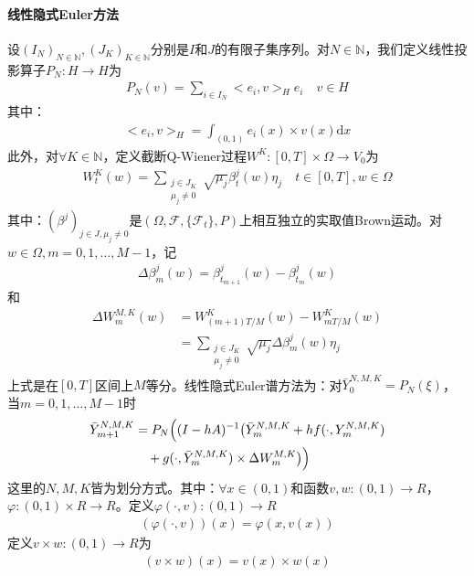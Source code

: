             \paragraph{线性隐式Euler方法}
            设$(I_N)_{N\in \mathbb{N}},(J_K)_{K\in \mathbb{N}}$分别是$I$和$J$的有限子集序列。对$N\in \mathbb{N}$，我们定义线性投影算子$P_N:H\rightarrow H$为
            \begin{align*}
                P_N(v) = \sum_{i\in I_N} \bigl<e_i,v\bigr>_He_i \quad v\in H
            \end{align*}
            其中：
            \begin{align*}
                \bigl<e_i,v\bigr>_H = \int_{(0,1)}e_i(x) \times v(x)\mathrm{d}x
            \end{align*}
            此外，对$\forall K\in \mathbb{N}$，定义截断Q-Wiener过程$W^K:[0,T]\times \Omega \rightarrow V_0$为
            \begin{align*}
                W_t^K(w) = \sum_{\substack{j\in J_K\\\mu_j \neq 0}}\sqrt{\mu_j}\beta_t^j(w)\eta_j \quad t\in[0,T],w\in \Omega
            \end{align*}
            其中：$(\beta^j)_{j\in J,\mu_j \neq 0}$是$(\Omega,\mathcal{F},\{\mathcal{F}_t\},P)$上相互独立的实取值Brown运动。对$w\in\Omega,m = 0,1,\dots,M-1$，记
            \begin{align*}
            \Delta \beta_m^j(w) = \beta_{t_{m+1}}^j(w) - \beta_{t_{m}}^j(w)
            \end{align*}
            和
            \begin{align*}
                 \Delta W_m^{M,K}(w) &= W_{(m+1)T/M}^K(w) - W_{mT/M}^K(w) \\
                 &= \sum_{\substack{j\in J_K\\\mu_j \neq 0}} \sqrt{\mu_j}\Delta \beta_m^j(w)\eta_j
            \end{align*}
            上式是在$[0,T]$区间上$M$等分。线性隐式Euler谱方法为：对$\bar{Y}_0^{N,M,K} = P_N(\xi)$，当$m = 0,1,\dots,M-1$时
            \begin{align*}
                \bar{Y}_{m+1}^{N,M,K} &= P_N \Bigl( (I-hA)^{-1} \bigl(\bar{Y}_m^{N,M,K} + hf(\cdot,Y_m^{N,M,K}) \\
                & \quad + g(\cdot,\bar{Y}_m^{N,M,K}) \times \Delta W_m^{M,K} \bigr) \Bigr)
            \end{align*}
            这里的$N,M,K$皆为划分方式。其中：$\forall x \in (0,1)$和函数$v,w:(0,1)\rightarrow R$，$\varphi :(0,1)\times R\rightarrow R$。定义$\varphi (\cdot,v):(0,1) \rightarrow R$
            \begin{align*}
                (\varphi (\cdot,v))(x) = \varphi (x,v(x))
            \end{align*}
            定义$v\times w:(0,1)\rightarrow R$为
            \begin{align*}
                (v\times w)(x) = v(x) \times w(x)
            \end{align*}

